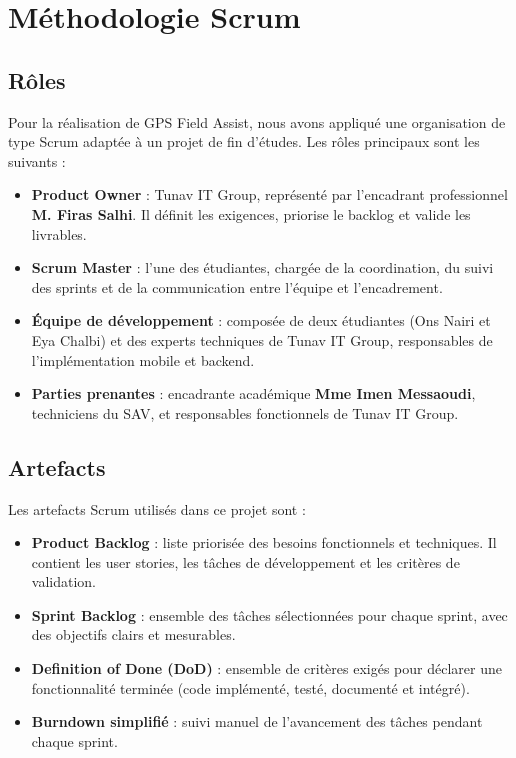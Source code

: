 \documentclass[12pt,a4paper]{report}
\begin{document}
 \section{Méthodologie Scrum}

 \subsection{Rôles}
 \noindent Pour la réalisation de GPS Field Assist, nous avons appliqué une organisation de type Scrum adaptée à un projet de fin d'études. Les rôles principaux sont les suivants :
 \begin{itemize}
     \item \textbf{Product Owner} : Tunav IT Group, représenté par l'encadrant professionnel \textbf{M. Firas Salhi}. Il définit les exigences, priorise le backlog et valide les livrables.
     \item \textbf{Scrum Master} : l'une des étudiantes, chargée de la coordination, du suivi des sprints et de la communication entre l'équipe et l'encadrement.
     \item \textbf{Équipe de développement} : composée de deux étudiantes (Ons Nairi et Eya Chalbi) et des experts techniques de Tunav IT Group, responsables de l'implémentation mobile et backend.
     \item \textbf{Parties prenantes} : encadrante académique \textbf{Mme Imen Messaoudi}, techniciens du SAV, et responsables fonctionnels de Tunav IT Group.
 \end{itemize}

 \subsection{Artefacts}
 \noindent Les artefacts Scrum utilisés dans ce projet sont :
 \begin{itemize}
     \item \textbf{Product Backlog} : liste priorisée des besoins fonctionnels et techniques. Il contient les user stories, les tâches de développement et les critères de validation.
     \item \textbf{Sprint Backlog} : ensemble des tâches sélectionnées pour chaque sprint, avec des objectifs clairs et mesurables.
     \item \textbf{Definition of Done (DoD)} : ensemble de critères exigés pour déclarer une fonctionnalité terminée (code implémenté, testé, documenté et intégré).
     \item \textbf{Burndown simplifié} : suivi manuel de l'avancement des tâches pendant chaque sprint.
 \end{itemize}
\end{document}
